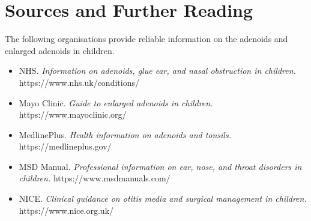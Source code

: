 \section*{Sources and Further Reading}
The following organisations provide reliable information on the adenoids and enlarged adenoids in children.

\begin{itemize}
    \item NHS. \textit{Information on adenoids, glue ear, and nasal obstruction in children.} https://www.nhs.uk/conditions/
    \item Mayo Clinic. \textit{Guide to enlarged adenoids in children.} https://www.mayoclinic.org/
    \item MedlinePlus. \textit{Health information on adenoids and tonsils.} https://medlineplus.gov/
    \item MSD Manual. \textit{Professional information on ear, nose, and throat disorders in children.} https://www.msdmanuals.com/
    \item NICE. \textit{Clinical guidance on otitis media and surgical management in children.} https://www.nice.org.uk/
\end{itemize}
